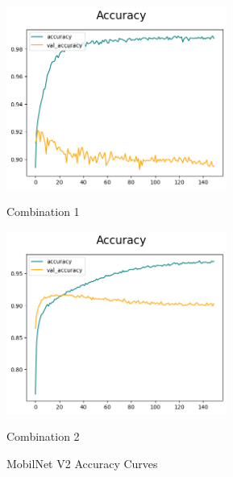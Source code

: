 \begin{figure}[H]
    \centering
    \begin{minipage}[b]{0.49\textwidth}
        \centering
        \includegraphics[width=\textwidth, height=6cm]{Figures/balanced_data/more_data/withoutbn/mn2/accuracy.png}
        \captionsetup{labelformat=empty}
        \caption{Combination 1}
        \label{fig:u_wo_r_a}
    \end{minipage}
    \hfill
    \begin{minipage}[b]{0.49\textwidth}
        \centering
        \includegraphics[width=\textwidth, height=6cm]{Figures/balanced_data/more_data/withbn/mn2/accuracy.png}
        \captionsetup{labelformat=empty}
        \caption{Combination 2}
        \label{fig:u_w_r_a}
    \end{minipage}
    \captionsetup{labelformat=default}
    \caption{MobilNet V2 Accuracy Curves}
\end{figure}


